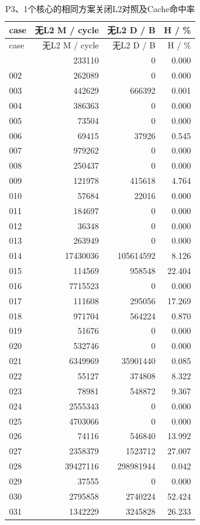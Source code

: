 \documentclass[anonymous,notoc]{gmcm2026}
\begin{document}
\begin{longtable}{lrrr}
\caption{P3、1个核心的相同方案关闭L2对照及Cache命中率}\\
\toprule
case & 无L2 M / cycle & 无L2 D / B & H / \%\\\midrule
\endfirsthead
\toprule
case & 无L2 M / cycle & 无L2 D / B & H / \%\\\midrule
\endhead
\bottomrule\endfoot
001 & 233110 & 0 & 0.000 \\
002 & 262089 & 0 & 0.000 \\
003 & 442629 & 666392 & 0.001 \\
004 & 386363 & 0 & 0.000 \\
005 & 73504 & 0 & 0.000 \\
006 & 69415 & 37926 & 0.545 \\
007 & 979262 & 0 & 0.000 \\
008 & 250437 & 0 & 0.000 \\
009 & 121978 & 415618 & 4.764 \\
010 & 57684 & 22016 & 0.000 \\
011 & 184697 & 0 & 0.000 \\
012 & 36348 & 0 & 0.000 \\
013 & 263949 & 0 & 0.000 \\
014 & 17430036 & 105614592 & 8.126 \\
015 & 114569 & 958548 & 22.404 \\
016 & 7715523 & 0 & 0.000 \\
017 & 111608 & 295056 & 17.269 \\
018 & 971704 & 564224 & 0.870 \\
019 & 51676 & 0 & 0.000 \\
020 & 532746 & 0 & 0.000 \\
021 & 6349969 & 35901440 & 0.085 \\
022 & 55127 & 374808 & 8.322 \\
023 & 78981 & 548872 & 9.367 \\
024 & 2555343 & 0 & 0.000 \\
025 & 4703066 & 0 & 0.000 \\
026 & 74116 & 546840 & 13.992 \\
027 & 2358379 & 1523712 & 27.007 \\
028 & 39427116 & 298981944 & 0.042 \\
029 & 37555 & 0 & 0.000 \\
030 & 2795858 & 2740224 & 52.424 \\
031 & 1342229 & 3245828 & 26.233 \\

\end{longtable}
\end{document}
